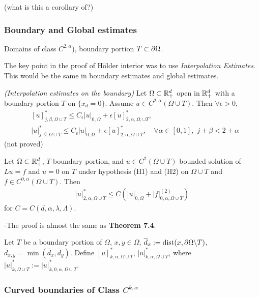 \documentclass[10pt,a4paper]{article}
\begin{document}
(what is this a corollary of?)
\s

\subsubsection*{Boundary and Global estimates}

 Domains of class $C^{2, \alpha}$), boundary portion $T\subset \partial \Omega$.
\s

The key point in the proof of H\"older interior was to use \emph{Interpolation Estimates}. This would be the same in boundary estimates and global estimates.
\s

 \emph{(Interpolation estimates on the boundary)} Let $\Omega\subset \mathbb{R}^d_+$ open in $\mathbb{R}^d_+$ with a boundary portion $T$ on $\{x_d =0\}$. Assume $u\in C^{2, \alpha}(\Omega \cup T)$. Then $\forall \epsilon >0$,
\begin{align*}
&[u]^*_{j, \beta, \Omega\cup T} \leq C_{\epsilon} |u|_{0, \Omega} + \epsilon [u]^*_{2, \alpha, \Omega, \cup T},  \\
&|u|^*_{j, \beta , \Omega\cup T} \leq C_{\epsilon}|u|_{0, \Omega} + \epsilon [u]^*_{2,\alpha, \Omega \cup T}, \quad \forall \alpha\in [0,1], \,\, j+ \beta < 2+ \alpha
\end{align*}
(not proved)
\s

 Let $\Omega \subset \mathbb{R}^d_+$, $T$ boundary portion, and $u \in C^2(\Omega \cup T)$ bounded solution of $Lu = f$ and $u=0$ on $T$ under hypothesis (H1) and (H2) on $\Omega \cup T$ and $f\in C^{0, \alpha}(\Omega \cup T)$. Then
\begin{align*}
|u|^{*}_{2, \alpha, \Omega \cup T}\leq C(|u|_{0, \Omega}+ |f|^{(2)}_{0, \alpha, \Omega \cup T})
\end{align*} 
for $C = C(d, \alpha, \lambda, \Lambda)$.

-The proof is almost the same as \textbf{Theorem 7.4}.
\s

 Let $T$ be a boundary portion of $\Omega$, $x,y \in \Omega$, $\overline{d}_x := \text{dist}(x, \partial \Omega \backslash T)$, $\bar{d}_{x,y} = \min (\bar{d}_x, \bar{d}_y)$. Define $[u]^*_{k, \alpha, \Omega \cup T}$, $|u|^*_{k,\alpha, \Omega\cup T}$, where $|u|^*_{k, \Omega\cup T} := |u|^*_{k,0,\alpha, \Omega\cup T}$.
\s

\subsubsection*{Curved boundaries of Class $C^{k, \alpha}$}
\end{document}
